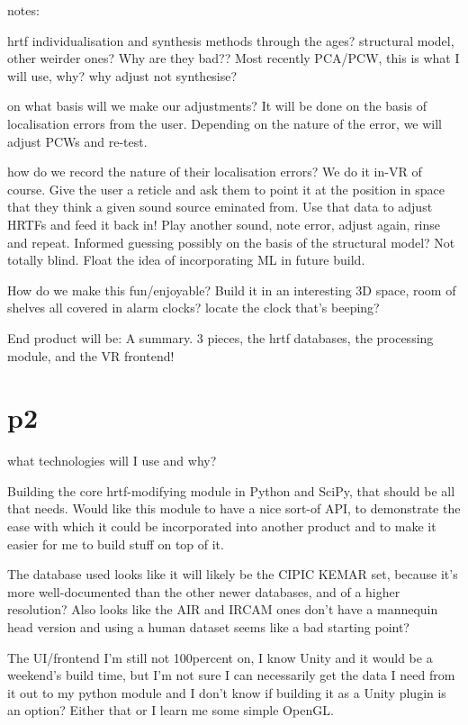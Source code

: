 \documentclass[10pt, oneside, a4paper, draft]{scrartcl}
\begin{document}
notes:

hrtf individualisation and synthesis methods through the ages? structural model, other weirder ones? Why are they bad?? Most recently PCA/PCW, this is what I will use, why? why adjust not synthesise? 

on what basis will we make our adjustments? It will be done on the basis of localisation errors from the user. Depending on the nature of the error, we will adjust PCWs and re-test. 

how do we record the nature of their localisation errors? We do it in-VR of course. Give the user a reticle and ask them to point it at the position in space that they think a given sound source eminated from. Use that data to adjust HRTFs and feed it back in! Play another sound, note error, adjust again, rinse and repeat. Informed guessing possibly on the basis of the structural model? Not totally blind. Float the idea of incorporating ML in future build. 

How do we make this fun/enjoyable? Build it in an interesting 3D space, room of shelves all covered in alarm clocks? locate the clock that's beeping? 

End product will be: A summary. 3 pieces, the hrtf databases, the processing module, and the VR frontend! 

\section*{p2}
what technologies will I use and why?

Building the core hrtf-modifying module in Python and SciPy, that should be all that needs. Would like this module to have a nice sort-of API, to demonstrate the ease with which it could be incorporated into another product and to make it easier for me to build stuff on top of it.   

The database used looks like it will likely be the CIPIC KEMAR set, because it's more well-documented than the other newer databases, and of a higher resolution? Also looks like the AIR and IRCAM ones don't have a mannequin head version and using a human dataset seems like a bad starting point?  

The UI/frontend I'm still not 100percent on, I know Unity and it would be a weekend's build time, but I'm not sure I can necessarily get the data I need from it out to my python module and I don't know if building it as a Unity plugin is an option? Either that or I learn me some simple OpenGL. 
\end{document}
